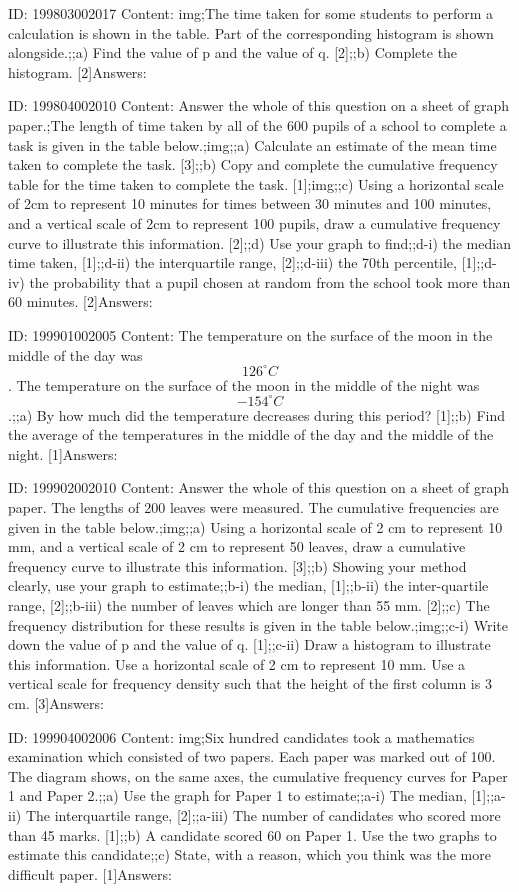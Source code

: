 \documentclass{article}
\begin{document}
ID: 199803002017
Content:
img;The time taken for some students to perform a calculation is shown in the table. Part of the corresponding histogram is shown alongside.;;a) Find the value of p and the value of q. [2];;b) Complete the histogram. [2]Answers:

ID: 199804002010
Content:
Answer the whole of this question on a sheet of graph paper.;The length of time taken by all of the 600 pupils of a school to complete a task is given in the table below.;img;;a) Calculate an estimate of the mean time taken to complete the task. [3];;b) Copy and complete the cumulative frequency table for the time taken to complete the task. [1];img;;c) Using a horizontal scale of 2cm to represent 10 minutes for times between 30 minutes and 100 minutes, and a vertical scale of 2cm to represent 100 pupils, draw a cumulative frequency curve to illustrate this information. [2];;d) Use your graph to find;;d-i) the median time taken, [1];;d-ii) the interquartile range, [2];;d-iii) the 70th percentile, [1];;d-iv) the probability that a pupil chosen at random from the school took more than 60 minutes. [2]Answers:

ID: 199901002005
Content:
The temperature on the surface of the moon in the middle of the day was $$126^{\circ}C$$. The temperature on the surface of the moon in the middle of the night was $$-154^{\circ}C$$.;;a) By how much did the temperature decreases during this period? [1];;b) Find the average of the temperatures in the middle of the day and the middle of the night. [1]Answers:

ID: 199902002010
Content:
Answer the whole of this question on a sheet of graph paper. The lengths of 200 leaves were measured. The cumulative frequencies are given in the table below.;img;;a) Using a horizontal scale of 2 cm to represent 10 mm, and a vertical scale of 2 cm to represent 50 leaves, draw a cumulative frequency curve to illustrate this information. [3];;b) Showing your method clearly, use your graph to estimate;;b-i) the median, [1];;b-ii) the inter-quartile range, [2];;b-iii) the number of leaves which are longer than 55 mm. [2];;c) The frequency distribution for these results is given in the table below.;img;;c-i) Write down the value of p and the value of q. [1];;c-ii) Draw a histogram to illustrate this information. Use a horizontal scale of 2 cm to represent 10 mm. Use a vertical scale for frequency density such that the height of the first column is 3 cm. [3]Answers:

ID: 199904002006
Content:
img;Six hundred candidates took a mathematics examination which consisted of two papers. Each paper was marked out of 100. The diagram shows, on the same axes, the cumulative frequency curves for Paper 1 and Paper 2.;;a) Use the graph for Paper 1 to estimate;;a-i) The median, [1];;a-ii) The interquartile range, [2];;a-iii) The number of candidates who scored more than 45 marks. [1];;b) A candidate scored 60 on Paper 1. Use the two graphs to estimate this candidate;;c) State, with a reason, which you think was the more difficult paper. [1]Answers:
\end{document}
